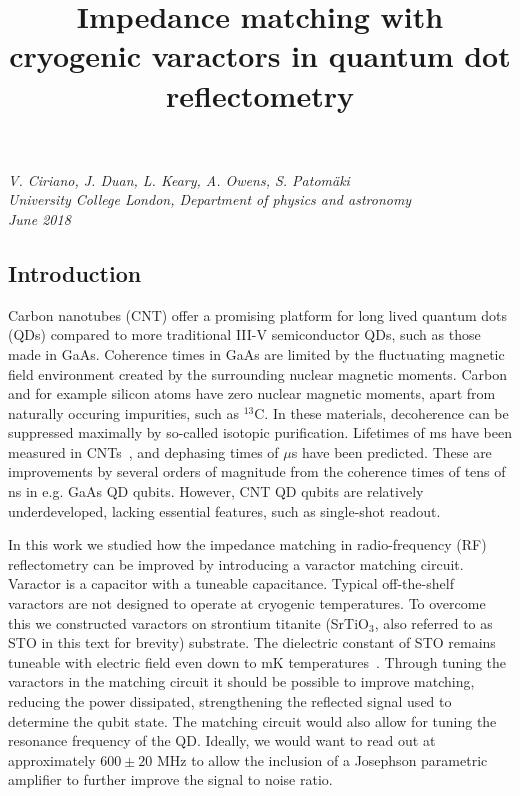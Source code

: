 \documentclass[10pt,a4paper,twoside]{article}
\title{\vspace{-2.5em}Impedance matching with cryogenic varactors in quantum dot reflectometry \vspace{-2em}}
\date{}
\begin{document}
\maketitle
\begin{flushleft}
\textit{V. Ciriano, J. Duan, L. Keary, A. Owens, S. Patom{\"a}ki}
\\
\textit{University College London, Department of physics and astronomy}
\\
\textit{June 2018}
\end{flushleft}
\begin{multicols}{2}
\section{Introduction}
Carbon nanotubes (CNT) offer a promising platform for long lived quantum dots (QDs) compared to more traditional III-V semiconductor QDs, such as those made in GaAs. Coherence times in GaAs are limited by the fluctuating magnetic field environment created by the surrounding nuclear magnetic moments. Carbon and for example silicon atoms have zero nuclear magnetic moments, apart from naturally occuring impurities, such as $^{13}$C. In these materials, decoherence can be suppressed maximally by so-called isotopic purification. Lifetimes of ms have been measured in CNTs~\cite{CNTtime}, and dephasing times  of $\mu$s have been predicted. These are improvements by several orders of magnitude from the coherence times of tens of ns in e.g. GaAs QD qubits. However, CNT QD qubits are relatively underdeveloped, lacking essential features, such as single-shot readout. 
\par
In this work we studied how the impedance matching in radio-frequency (RF) reflectometry can be improved by introducing a varactor matching circuit. Varactor is a capacitor with a tuneable capacitance. Typical off-the-shelf varactors are not designed to operate at cryogenic temperatures. To overcome this we constructed varactors on strontium titanite (SrTiO$_3$, also referred to as STO in this text for brevity) substrate. The dielectric constant of STO remains tuneable with electric field even down to mK temperatures~\cite{PhysRevB.19.3593}. Through tuning the varactors in the matching circuit it should be possible to improve matching, reducing the power dissipated, strengthening the reflected signal used to determine the qubit state. The matching circuit would also allow for tuning the resonance frequency of the QD. Ideally, we would want to read out at approximately $600 \pm 20$ MHz to allow the inclusion of a Josephson parametric amplifier to further improve the signal to noise ratio. 

\end{multicols}
\end{document}
